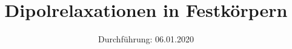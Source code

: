 
\subject{V48}
\title{Dipolrelaxationen in Festkörpern}
\date{%
  Durchführung: 06.01.2020
}



\maketitle
\thispagestyle{empty}
\tableofcontents
\newpage

\newpage

\newpage

\newpage

\printbibliography{}


